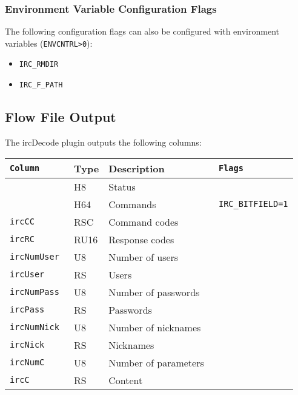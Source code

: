 \documentclass[documentation]{subfiles}
\begin{document}
\subsubsection{Environment Variable Configuration Flags}
The following configuration flags can also be configured with environment variables ({\tt ENVCNTRL>0}):
\begin{itemize}
    \item {\tt IRC\_RMDIR}
    \item {\tt IRC\_F\_PATH}
\end{itemize}

\subsection{Flow File Output}
The ircDecode plugin outputs the following columns:
\begin{longtable}{>{\tt}lll>{\tt\small}l}
    \toprule
    {\bf Column} & {\bf Type} & {\bf Description} & {\bf Flags}\\
    \midrule\endhead%
    \nameref{ircStat} & H8   & Status               & \\
    \nameref{ircCBF}  & H64  & Commands             & IRC\_BITFIELD=1\\
    ircCC             & RSC  & Command codes        & \\
    ircRC             & RU16 & Response codes       & \\
    ircNumUser        & U8   & Number of users      & \\
    ircUser           & RS   & Users                & \\
    ircNumPass        & U8   & Number of passwords  & \\
    ircPass           & RS   & Passwords            & \\
    ircNumNick        & U8   & Number of nicknames  & \\
    ircNick           & RS   & Nicknames            & \\
    ircNumC           & U8   & Number of parameters & \\
    ircC              & RS   & Content              & \\
    \bottomrule
\end{longtable}

\clearpage
\end{document}
